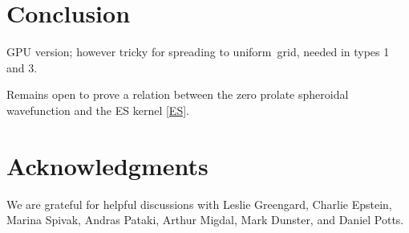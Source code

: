 \documentclass[10pt]{article}
\newcommand{\U}{{uniform}}
\begin{document}
\section{Conclusion}



GPU version; however tricky for spreading to \U\ grid, needed in types 1 and 3.


Remains open to prove a relation between the zero prolate spheroidal
wavefunction and the ES kernel \eqref{ES}.


\section*{Acknowledgments}

We are grateful for helpful discussions with Leslie Greengard,
Charlie Epstein, Marina Spivak, Andras Pataki, Arthur Migdal,
Mark Dunster,
and Daniel Potts.




\end{document}

